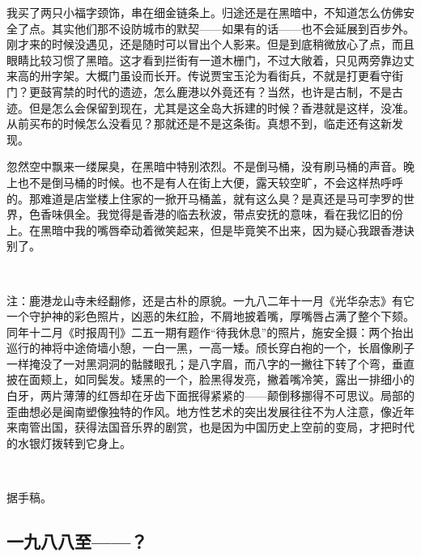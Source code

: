 \par 我买了两只小福字颈饰，串在细金链条上。归途还是在黑暗中，不知道怎么仿佛安全了点。其实他们那不设防城市的默契——如果有的话——也不会延展到百步外。刚才来的时候没遇见，还是随时可以冒出个人影来。但是到底稍微放心了点，而且眼睛比较习惯了黑暗。这才看到拦街有一道木栅门，不过大敞着，只见两旁靠边丈来高的卅字架。大概门虽设而长开。传说贾宝玉沦为看街兵，不就是打更看守街门？更鼓宵禁的时代的遗迹，怎么鹿港以外竟还有？当然，也许是古制，不是古迹。但是怎么会保留到现在，尤其是这全岛大拆建的时候？香港就是这样，没准。从前买布的时候怎么没看见？那就还是不是这条街。真想不到，临走还有这新发现。
\par 忽然空中飘来一缕屎臭，在黑暗中特别浓烈。不是倒马桶，没有刷马桶的声音。晚上也不是倒马桶的时候。也不是有人在街上大便，露天较空旷，不会这样热呼呼的。那难道是店堂楼上住家的一掀开马桶盖，就有这么臭？是真还是马可孛罗的世界，色香味俱全。我觉得是香港的临去秋波，带点安抚的意味，看在我忆旧的份上。在黑暗中我的嘴唇牵动着微笑起来，但是毕竟笑不出来，因为疑心我跟香港诀别了。
\par  
\par 注：鹿港龙山寺未经翻修，还是古朴的原貌。一九八二年十一月《光华杂志》有它一个守护神的彩色照片，凶恶的朱红脸，不屑地披着嘴，厚嘴唇占满了整个下颏。同年十二月《时报周刊》二五一期有题作“待我休息”的照片，施安全摄：两个抬出巡行的神将中途倚墙小憩，一白一黑，一高一矮。颀长穿白袍的一个，长眉像刷子一样掩没了一对黑洞洞的骷髅眼孔；是八字眉，而八字的一撇往下转了个弯，垂直披在面颊上，如同鬓发。矮黑的一个，脸黑得发亮，撇着嘴冷笑，露出一排细小的白牙，两片薄薄的红唇却在牙齿下面抿得紧紧的——颠倒移挪得不可思议。局部的歪曲想必是闽南塑像独特的作风。地方性艺术的突出发展往往不为人注意，像近年来南管出国，获得法国音乐界的剧赏，也是因为中国历史上空前的变局，才把时代的水银灯拨转到它身上。
\par  
\par *据手稿。



\subsection{一九八八至——？}

